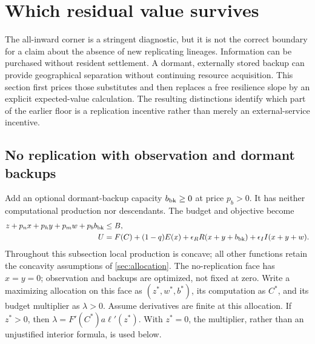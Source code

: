\section{Which residual value survives}
\label{sec:residual}

The all-inward corner is a stringent diagnostic, but it is not the correct
boundary for a claim about the absence of new replicating lineages.
Information can be purchased without resident settlement. A dormant,
externally stored backup can provide geographical separation without
continuing resource acquisition. This section first prices those substitutes
and then replaces a free resilience slope by an explicit expected-value
calculation. The resulting distinctions identify which part of the earlier
floor is a replication incentive rather than merely an external-service
incentive.

\subsection{No replication with observation and dormant backups}
Add an optional dormant-backup capacity $b_{\rm bk}\geq0$ at price $p_b>0$.
It has neither computational production nor descendants. The budget and
objective become
\begin{align}
 z+p_nx+p_hy+p_mw+p_bb_{\rm bk}&\leq B,\nonumber\\
 U&=F(C)+(1-q)E(x)+\epsilon_RR(x+y+b_{\rm bk})
                  +\epsilon_II(x+y+w).
 \label{eq:backup-model}
\end{align}
Throughout this subsection local production is concave; all other functions retain the concavity assumptions of \cref{sec:allocation}.
The no-replication face has $x=y=0$; observation and backups are optimized,
not fixed at zero. Write a maximizing allocation on this face as
$(z^*,w^*,b^*)$, its computation as $C^*$, and its budget multiplier as
$\lambda>0$. Assume derivatives are finite at this allocation. If $z^*>0$,
then $\lambda=F'(C^*)a\ell'(z^*)$. With $z^*=0$, the multiplier, rather
than an unjustified interior formula, is used below.

